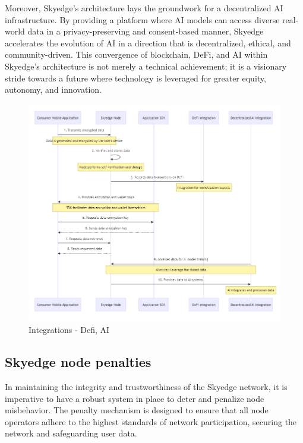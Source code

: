 \documentclass{article}
\begin{document}
Moreover, Skyedge's architecture lays the groundwork for a decentralized AI infrastructure. By providing a platform where AI models can access diverse real-world data in a privacy-preserving and consent-based manner, Skyedge accelerates the evolution of AI in a direction that is decentralized, ethical, and community-driven. This convergence of blockchain, DeFi, and AI within Skyedge's architecture is not merely a technical achievement; it is a visionary stride towards a future where technology is leveraged for greater equity, autonomy, and innovation.

\begin{figure}[h]
    \centering
    \includegraphics[width=1\linewidth]{skyedge-02.png}
    \caption{Integrations - Defi, AI}
    \label{fig:integration}
\end{figure}

\subsection{Skyedge node penalties}
In maintaining the integrity and trustworthiness of the Skyedge network, it is imperative to have a robust system in place to deter and penalize node misbehavior. The penalty mechanism is designed to ensure that all node operators adhere to the highest standards of network participation, securing the network and safeguarding user data.
\end{document}
